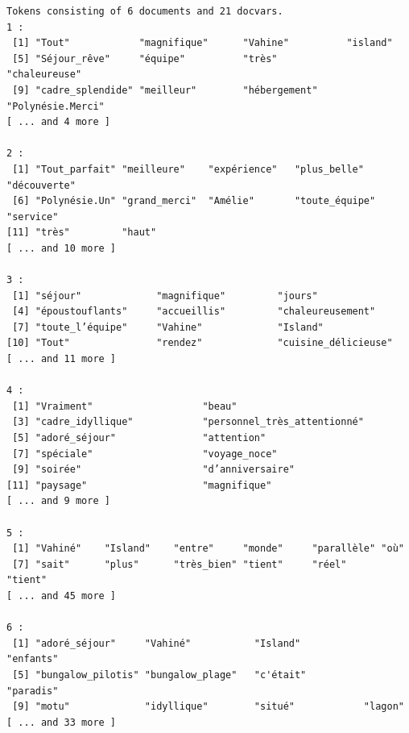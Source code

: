 \documentclass[
  letterpaper,
  DIV=11,
  numbers=noendperiod]{scrreprt}
\newenvironment{Shaded}{\begin{snugshade}}{\end{snugshade}}
\newcommand{\AttributeTok}[1]{\textcolor[rgb]{0.40,0.45,0.13}{#1}}
\newcommand{\DecValTok}[1]{\textcolor[rgb]{0.68,0.00,0.00}{#1}}
\newcommand{\FunctionTok}[1]{\textcolor[rgb]{0.28,0.35,0.67}{#1}}
\newcommand{\NormalTok}[1]{\textcolor[rgb]{0.00,0.23,0.31}{#1}}
\newcommand{\OtherTok}[1]{\textcolor[rgb]{0.00,0.23,0.31}{#1}}
\newcommand{\SpecialCharTok}[1]{\textcolor[rgb]{0.37,0.37,0.37}{#1}}
\begin{document}
\begin{Shaded}
\end{Shaded}

\begin{verbatim}
Tokens consisting of 6 documents and 21 docvars.
1 :
 [1] "Tout"            "magnifique"      "Vahine"          "island"         
 [5] "Séjour_rêve"     "équipe"          "très"            "chaleureuse"    
 [9] "cadre_splendide" "meilleur"        "hébergement"     "Polynésie.Merci"
[ ... and 4 more ]

2 :
 [1] "Tout_parfait" "meilleure"    "expérience"   "plus_belle"   "découverte"  
 [6] "Polynésie.Un" "grand_merci"  "Amélie"       "toute_équipe" "service"     
[11] "très"         "haut"        
[ ... and 10 more ]

3 :
 [1] "séjour"             "magnifique"         "jours"             
 [4] "époustouflants"     "accueillis"         "chaleureusement"   
 [7] "toute_l’équipe"     "Vahine"             "Island"            
[10] "Tout"               "rendez"             "cuisine_délicieuse"
[ ... and 11 more ]

4 :
 [1] "Vraiment"                   "beau"                      
 [3] "cadre_idyllique"            "personnel_très_attentionné"
 [5] "adoré_séjour"               "attention"                 
 [7] "spéciale"                   "voyage_noce"               
 [9] "soirée"                     "d’anniversaire"            
[11] "paysage"                    "magnifique"                
[ ... and 9 more ]

5 :
 [1] "Vahiné"    "Island"    "entre"     "monde"     "parallèle" "où"       
 [7] "sait"      "plus"      "très_bien" "tient"     "réel"      "tient"    
[ ... and 45 more ]

6 :
 [1] "adoré_séjour"     "Vahiné"           "Island"           "enfants"         
 [5] "bungalow_pilotis" "bungalow_plage"   "c'était"          "paradis"         
 [9] "motu"             "idyllique"        "situé"            "lagon"           
[ ... and 33 more ]
\end{verbatim}
\end{document}
